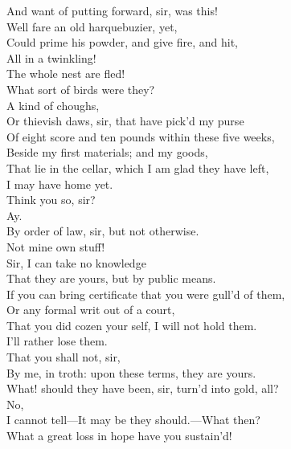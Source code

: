 \documentclass[a4paper,oneside]{memoir}
\begin{document}
\begin{drama*}
And want of putting forward, sir, was this!\\
Well fare an old harquebuzier, yet,\\
Could prime his powder, and give fire, and hit,\\
All in a twinkling!\\
\mammonspeaks {} The whole nest are fled!\\
\lovewitspeaks What sort of birds were they?\\
\mammonspeaks {} A kind of choughs,\\
Or thievish daws, sir, that have pick'd my purse\\
Of eight score and ten pounds within these five weeks,\\
Beside my first materials; and my goods,\\
That lie in the cellar, which I am glad they have left,\\
I may have home yet.\\
\lovewitspeaks {} Think you so, sir?\\
\mammonspeaks {} Ay.\\
\lovewitspeaks By order of law, sir, but not otherwise.\\
\mammonspeaks Not mine own stuff!\\
\lovewitspeaks {} Sir, I can take no knowledge\\
That they are yours, but by public means.\\
If you can bring certificate that you were gull'd of them,\\
Or any formal writ out of a court,\\
That you did cozen your self, I will not hold them.\\
\mammonspeaks I'll rather lose them.\\
\lovewitspeaks {} That you shall not, sir,\\
By me, in troth: upon these terms, they are yours.\\
What! should they have been, sir, turn'd into gold, all?\\
\mammonspeaks No,\\
I cannot tell---It may be they should.---What then?\\
\lovewitspeaks What a great loss in hope have you sustain'd!\\

\end{drama*}
\end{document}
